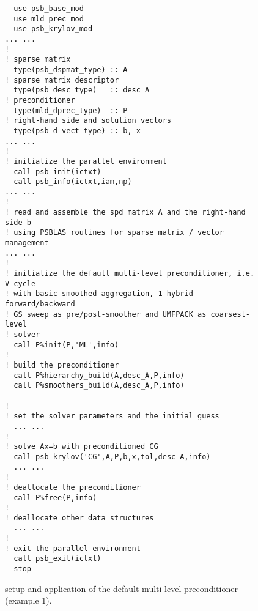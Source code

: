 \begin{figure}[tbp]
\begin{center}
\begin{minipage}{.90\textwidth} 
{\small
\begin{verbatim}
  use psb_base_mod
  use mld_prec_mod
  use psb_krylov_mod
... ...
!
! sparse matrix
  type(psb_dspmat_type) :: A
! sparse matrix descriptor
  type(psb_desc_type)   :: desc_A
! preconditioner
  type(mld_dprec_type)  :: P
! right-hand side and solution vectors
  type(psb_d_vect_type) :: b, x
... ...
!
! initialize the parallel environment
  call psb_init(ictxt)
  call psb_info(ictxt,iam,np)
... ...
!
! read and assemble the spd matrix A and the right-hand side b 
! using PSBLAS routines for sparse matrix / vector management
... ...
!
! initialize the default multi-level preconditioner, i.e. V-cycle
! with basic smoothed aggregation, 1 hybrid forward/backward
! GS sweep as pre/post-smoother and UMFPACK as coarsest-level
! solver
  call P%init(P,'ML',info)
!
! build the preconditioner
  call P%hierarchy_build(A,desc_A,P,info)
  call P%smoothers_build(A,desc_A,P,info)

!
! set the solver parameters and the initial guess
  ... ...
!
! solve Ax=b with preconditioned CG
  call psb_krylov('CG',A,P,b,x,tol,desc_A,info)
  ... ...
!
! deallocate the preconditioner
  call P%free(P,info)
!
! deallocate other data structures
  ... ...
!
! exit the parallel environment
  call psb_exit(ictxt)
  stop
\end{verbatim}
}
\end{minipage}
\caption{setup and application of the default multi-level preconditioner (example 1).
\label{fig:ex1}}
\end{center}
\end{figure}

